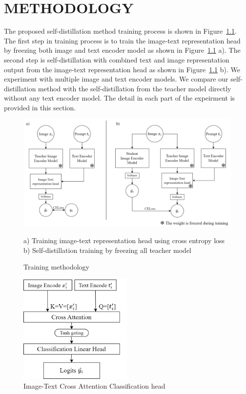 \chapter{METHODOLOGY}

The proposed self-distillation method training process is shown in Figure~\ref{fig:methodology}.
The first step in training process is to train the image-text representation head by freezing both image and text encoder model as shown in Figure~\ref{fig:methodology} a).
The second step is self-distillation with combined text and image representation output from the image-text representation head as shown in Figure~\ref{fig:methodology} b).
We experiment with multiple image and text encoder models.
We compare our self-distillation method with the self-distillation from the teacher model directly without any text encoder model.
The detail in each part of the expeirment is provided in this section.

\begin{figure}[h]
    \caption{Training methodology}
    \label{fig:methodology}
    \begin{center}
        \includegraphics[width=1\textwidth]{Images/Methodology.png}
    \end{center}
    \small a) Training image-text representation head using cross entropy loss b) Self-distillation training by freezing all teacher model
\end{figure}

\begin{figure}[h]
    \caption{Image-Text Cross Attention Classification head}
    \label{fig:cross_attention}
    \centering
    \includegraphics[width=0.5\textwidth]{Images/CrossAttention.png}
\end{figure}

